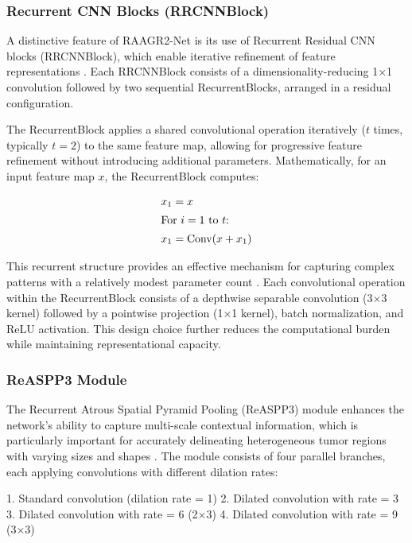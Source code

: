 \documentclass[12pt,a4paper]{article}
\begin{document}
\subsubsection{Recurrent CNN Blocks (RRCNNBlock)}

A distinctive feature of RAAGR2-Net is its use of Recurrent Residual CNN blocks (RRCNNBlock), which enable iterative refinement of feature representations \cite{Rehman2023RAAGR2, Alom2019R2UNet}. Each RRCNNBlock consists of a dimensionality-reducing 1×1 convolution followed by two sequential RecurrentBlocks, arranged in a residual configuration.

The RecurrentBlock applies a shared convolutional operation iteratively ($t$ times, typically $t=2$) to the same feature map, allowing for progressive feature refinement without introducing additional parameters. Mathematically, for an input feature map $x$, the RecurrentBlock computes:

\begin{align}
x_1 &= x \\
\intertext{For $i = 1$ to $t$:}
x_1 &= \textrm{Conv}(x + x_1)
\end{align}

This recurrent structure provides an effective mechanism for capturing complex patterns with a relatively modest parameter count \cite{Alom2019R2UNet}. Each convolutional operation within the RecurrentBlock consists of a depthwise separable convolution (3×3 kernel) followed by a pointwise projection (1×1 kernel), batch normalization, and ReLU activation. This design choice further reduces the computational burden while maintaining representational capacity.

\subsubsection{ReASPP3 Module}

The Recurrent Atrous Spatial Pyramid Pooling (ReASPP3) module enhances the network's ability to capture multi-scale contextual information, which is particularly important for accurately delineating heterogeneous tumor regions with varying sizes and shapes \cite{Rehman2023RAAGR2}. The module consists of four parallel branches, each applying convolutions with different dilation rates:

1. Standard convolution (dilation rate = 1)
2. Dilated convolution with rate = 3
3. Dilated convolution with rate = 6 (2×3)
4. Dilated convolution with rate = 9 (3×3)
\end{document}
